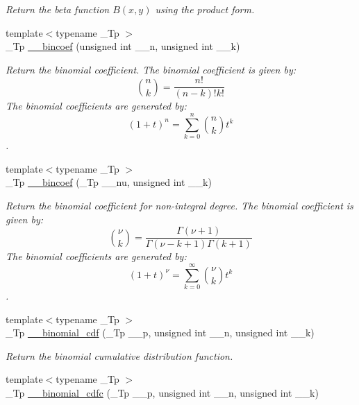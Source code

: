 \begin{DoxyCompactItemize}
\begin{DoxyCompactList}\small\item\em Return the beta function $B(x,y)$ using the product form. \end{DoxyCompactList}\item 
{\footnotesize template$<$typename \+\_\+\+Tp $>$ }\\\+\_\+\+Tp \hyperlink{namespacestd_1_1____detail_ab0888bd3901e6501b1f451d6adcf967a}{\+\_\+\+\_\+bincoef} (unsigned int \+\_\+\+\_\+n, unsigned int \+\_\+\+\_\+k)
\begin{DoxyCompactList}\small\item\em Return the binomial coefficient. The binomial coefficient is given by\+: \[ \binom{n}{k} = \frac{n!}{(n-k)! k!} \] The binomial coefficients are generated by\+: \[ \left(1 + t\right)^n = \sum_{k=0}^n \binom{n}{k} t^k \]. \end{DoxyCompactList}\item 
{\footnotesize template$<$typename \+\_\+\+Tp $>$ }\\\+\_\+\+Tp \hyperlink{namespacestd_1_1____detail_a537c9234f68801f2cdb60020cb98fbbd}{\+\_\+\+\_\+bincoef} (\+\_\+\+Tp \+\_\+\+\_\+nu, unsigned int \+\_\+\+\_\+k)
\begin{DoxyCompactList}\small\item\em Return the binomial coefficient for non-\/integral degree. The binomial coefficient is given by\+: \[ \binom{\nu}{k} = \frac{\Gamma(\nu+1)}{\Gamma(\nu-k+1) \Gamma(k+1)} \] The binomial coefficients are generated by\+: \[ \left(1 + t\right)^\nu = \sum_{k=0}^\infty \binom{\nu}{k} t^k \]. \end{DoxyCompactList}\item 
{\footnotesize template$<$typename \+\_\+\+Tp $>$ }\\\+\_\+\+Tp \hyperlink{namespacestd_1_1____detail_aefa3217863e0f50cd8f5379947cefcbd}{\+\_\+\+\_\+binomial\+\_\+cdf} (\+\_\+\+Tp \+\_\+\+\_\+p, unsigned int \+\_\+\+\_\+n, unsigned int \+\_\+\+\_\+k)
\begin{DoxyCompactList}\small\item\em Return the binomial cumulative distribution function. \end{DoxyCompactList}\item 
{\footnotesize template$<$typename \+\_\+\+Tp $>$ }\\\+\_\+\+Tp \hyperlink{namespacestd_1_1____detail_a1fd732a432f73686c97311e6976a0e76}{\+\_\+\+\_\+binomial\+\_\+cdfc} (\+\_\+\+Tp \+\_\+\+\_\+p, unsigned int \+\_\+\+\_\+n, unsigned int \+\_\+\+\_\+k)

\end{DoxyCompactItemize}
